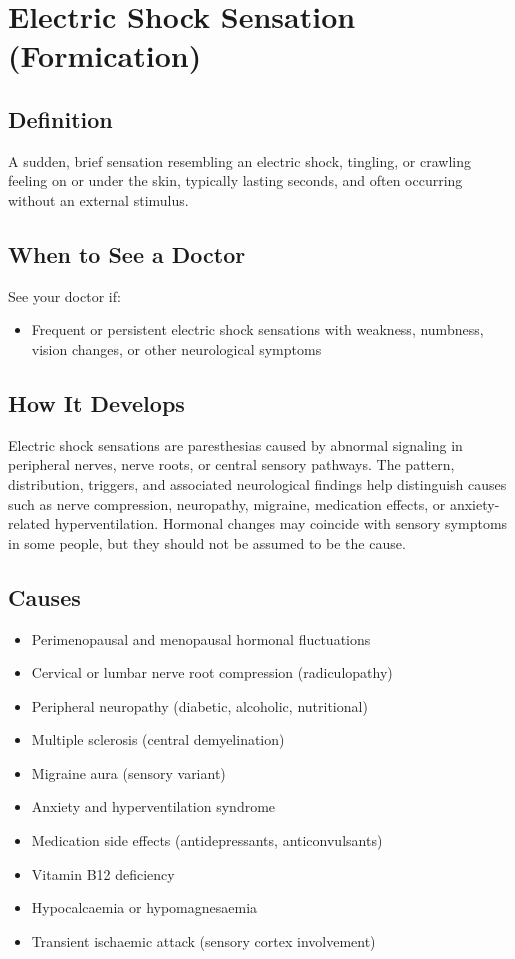\chapter{Electric Shock Sensation (Formication)}

\section*{Definition}
A sudden, brief sensation resembling an electric shock, tingling, or crawling feeling on or under the skin, typically lasting seconds, and often occurring without an external stimulus.

\section*{When to See a Doctor}
See your doctor if:
\begin{itemize}
  \item Frequent or persistent electric shock sensations with weakness, numbness, vision changes, or other neurological symptoms
\end{itemize}

\section*{How It Develops}
Electric shock sensations are paresthesias caused by abnormal signaling in peripheral nerves, nerve roots, or central sensory pathways. The pattern, distribution, triggers, and associated neurological findings help distinguish causes such as nerve compression, neuropathy, migraine, medication effects, or anxiety-related hyperventilation. Hormonal changes may coincide with sensory symptoms in some people, but they should not be assumed to be the cause.

\section*{Causes}
\begin{itemize}
  \item Perimenopausal and menopausal hormonal fluctuations
  \item Cervical or lumbar nerve root compression (radiculopathy)
  \item Peripheral neuropathy (diabetic, alcoholic, nutritional)
  \item Multiple sclerosis (central demyelination)
  \item Migraine aura (sensory variant)
  \item Anxiety and hyperventilation syndrome
  \item Medication side effects (antidepressants, anticonvulsants)
  \item Vitamin B12 deficiency
  \item Hypocalcaemia or hypomagnesaemia
  \item Transient ischaemic attack (sensory cortex involvement)
\end{itemize}

